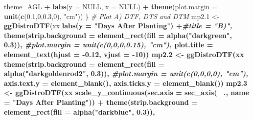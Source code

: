 \documentclass[
]{article}
\newenvironment{Shaded}{\begin{snugshade}}{\end{snugshade}}
\newcommand{\CommentTok}[1]{\textcolor[rgb]{0.56,0.35,0.01}{\textit{#1}}}
\newcommand{\DataTypeTok}[1]{\textcolor[rgb]{0.13,0.29,0.53}{#1}}
\newcommand{\DecValTok}[1]{\textcolor[rgb]{0.00,0.00,0.81}{#1}}
\newcommand{\FloatTok}[1]{\textcolor[rgb]{0.00,0.00,0.81}{#1}}
\newcommand{\KeywordTok}[1]{\textcolor[rgb]{0.13,0.29,0.53}{\textbf{#1}}}
\newcommand{\NormalTok}[1]{#1}
\newcommand{\OperatorTok}[1]{\textcolor[rgb]{0.81,0.36,0.00}{\textbf{#1}}}
\newcommand{\OtherTok}[1]{\textcolor[rgb]{0.56,0.35,0.01}{#1}}
\newcommand{\StringTok}[1]{\textcolor[rgb]{0.31,0.60,0.02}{#1}}
\begin{document}
\begin{Shaded}
\begin{Highlighting}[]
{{{{{{{{\StringTok{    }\NormalTok{theme_AGL }\OperatorTok{+}\StringTok{ }\KeywordTok{labs}\NormalTok{(}\DataTypeTok{y =} \OtherTok{NULL}\NormalTok{, }\DataTypeTok{x =} \OtherTok{NULL}\NormalTok{) }\OperatorTok{+}
\StringTok{    }\KeywordTok{theme}\NormalTok{(}\DataTypeTok{plot.margin =} \KeywordTok{unit}\NormalTok{(}\KeywordTok{c}\NormalTok{(}\FloatTok{0.1}\NormalTok{,}\DecValTok{0}\NormalTok{,}\FloatTok{0.3}\NormalTok{,}\DecValTok{0}\NormalTok{), }\StringTok{"cm"}\NormalTok{))}
\NormalTok{\}}
\CommentTok{# Plot A) DTF, DTS and DTM}
\NormalTok{mp2}\FloatTok{.1}\NormalTok{ <-}\StringTok{ }\KeywordTok{ggDistroDTF}\NormalTok{(xx }\OperatorTok{%
\StringTok{  }\KeywordTok{labs}\NormalTok{(}\DataTypeTok{y =} \StringTok{"Days After Planting"}\NormalTok{) }\OperatorTok{+}\CommentTok{#title = "B)", }
\StringTok{  }\KeywordTok{theme}\NormalTok{(}\DataTypeTok{strip.background =} \KeywordTok{element_rect}\NormalTok{(}\DataTypeTok{fill =} \KeywordTok{alpha}\NormalTok{(}\StringTok{"darkgreen"}\NormalTok{, }\FloatTok{0.3}\NormalTok{)),}
        \CommentTok{#plot.margin = unit(c(0,0,0,0.15), "cm"),}
        \DataTypeTok{plot.title =} \KeywordTok{element_text}\NormalTok{(}\DataTypeTok{hjust =} \FloatTok{-0.12}\NormalTok{, }\DataTypeTok{vjust =} \DecValTok{-10}\NormalTok{))}
\NormalTok{mp2}\FloatTok{.2}\NormalTok{ <-}\StringTok{ }\KeywordTok{ggDistroDTF}\NormalTok{(xx }\OperatorTok{%
\StringTok{  }\KeywordTok{theme}\NormalTok{(}\DataTypeTok{strip.background =} \KeywordTok{element_rect}\NormalTok{(}\DataTypeTok{fill =} \KeywordTok{alpha}\NormalTok{(}\StringTok{"darkgoldenrod2"}\NormalTok{, }\FloatTok{0.3}\NormalTok{)),}
        \CommentTok{#plot.margin = unit(c(0,0,0,0), "cm"),}
        \DataTypeTok{axis.text.y =} \KeywordTok{element_blank}\NormalTok{(), }
        \DataTypeTok{axis.ticks.y =} \KeywordTok{element_blank}\NormalTok{())}
\NormalTok{mp2}\FloatTok{.3}\NormalTok{ <-}\StringTok{ }\KeywordTok{ggDistroDTF}\NormalTok{(xx }\OperatorTok{%
\StringTok{  }\KeywordTok{scale_y_continuous}\NormalTok{(}\DataTypeTok{sec.axis =} \KeywordTok{sec_axis}\NormalTok{(}\OperatorTok{~}\StringTok{ }\NormalTok{., }\DataTypeTok{name =} \StringTok{"Days After Planting"}\NormalTok{)) }\OperatorTok{+}
\StringTok{  }\KeywordTok{theme}\NormalTok{(}\DataTypeTok{strip.background =} \KeywordTok{element_rect}\NormalTok{(}\DataTypeTok{fill =} \KeywordTok{alpha}\NormalTok{(}\StringTok{"darkblue"}\NormalTok{, }\FloatTok{0.3}\NormalTok{)),}
}}}}}}}}}}}
\end{Highlighting}
\end{Shaded}
\end{document}
